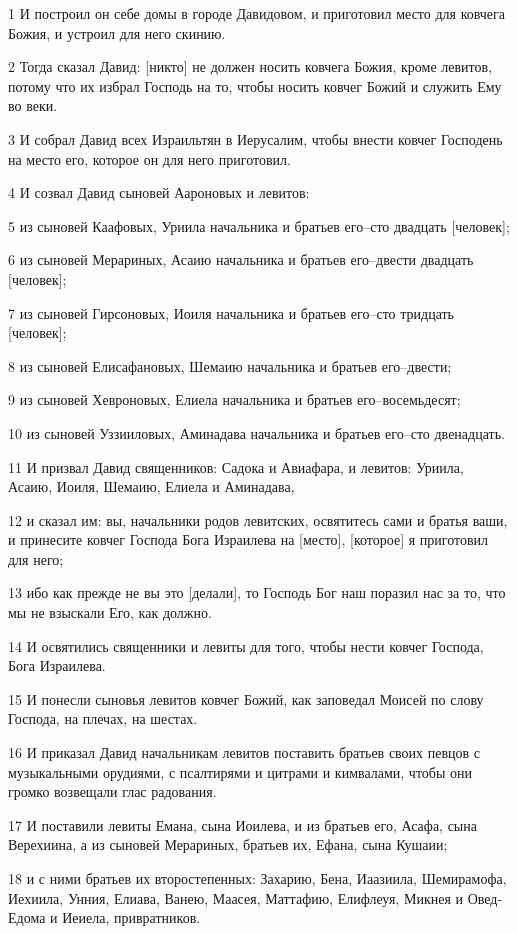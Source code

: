 \par 1 И построил он себе домы в городе Давидовом, и приготовил место для ковчега Божия, и устроил для него скинию.
\par 2 Тогда сказал Давид: [никто] не должен носить ковчега Божия, кроме левитов, потому что их избрал Господь на то, чтобы носить ковчег Божий и служить Ему во веки.
\par 3 И собрал Давид всех Израильтян в Иерусалим, чтобы внести ковчег Господень на место его, которое он для него приготовил.
\par 4 И созвал Давид сыновей Аароновых и левитов:
\par 5 из сыновей Каафовых, Уриила начальника и братьев его--сто двадцать [человек];
\par 6 из сыновей Мерариных, Асаию начальника и братьев его--двести двадцать [человек];
\par 7 из сыновей Гирсоновых, Иоиля начальника и братьев его--сто тридцать [человек];
\par 8 из сыновей Елисафановых, Шемаию начальника и братьев его--двести;
\par 9 из сыновей Хевроновых, Елиела начальника и братьев его--восемьдесят;
\par 10 из сыновей Уззииловых, Аминадава начальника и братьев его--сто двенадцать.
\par 11 И призвал Давид священников: Садока и Авиафара, и левитов: Уриила, Асаию, Иоиля, Шемаию, Елиела и Аминадава,
\par 12 и сказал им: вы, начальники родов левитских, освятитесь сами и братья ваши, и принесите ковчег Господа Бога Израилева на [место], [которое] я приготовил для него;
\par 13 ибо как прежде не вы это [делали], то Господь Бог наш поразил нас за то, что мы не взыскали Его, как должно.
\par 14 И освятились священники и левиты для того, чтобы нести ковчег Господа, Бога Израилева.
\par 15 И понесли сыновья левитов ковчег Божий, как заповедал Моисей по слову Господа, на плечах, на шестах.
\par 16 И приказал Давид начальникам левитов поставить братьев своих певцов с музыкальными орудиями, с псалтирями и цитрами и кимвалами, чтобы они громко возвещали глас радования.
\par 17 И поставили левиты Емана, сына Иоилева, и из братьев его, Асафа, сына Верехиина, а из сыновей Мерариных, братьев их, Ефана, сына Кушаии;
\par 18 и с ними братьев их второстепенных: Захарию, Бена, Иаазиила, Шемирамофа, Иехиила, Унния, Елиава, Ванею, Маасея, Маттафию, Елифлеуя, Микнея и Овед-Едома и Иеиела, привратников.
